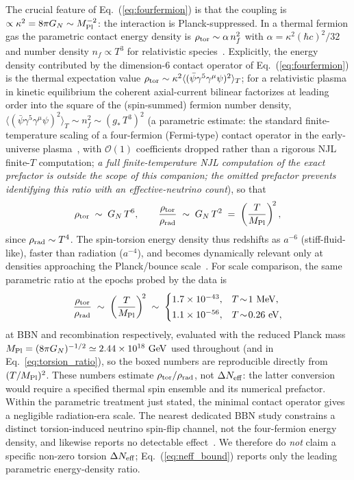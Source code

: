 \documentclass[aps,prd,twocolumn,superscriptaddress,showpacs,preprintnumbers,nofootinbib,longbibliography,floatfix]{revtex4-2}
\newcommand{\Neff}{N_{\rm eff}}
\begin{document}
The crucial feature of Eq.~(\ref{eq:fourfermion}) is that the coupling is
$\propto\kappa^2=8\pi G_N\sim M_{\rm Pl}^{-2}$: the interaction is
Planck-suppressed. In a thermal fermion gas the parametric contact energy
density is $\rho_{\rm tor}\sim\alpha\,n_f^2$ with $\alpha=\kappa^2(\hbar
c)^2/32$ and number density $n_f\propto T^3$ for relativistic
species~\cite{UngerPoplawski2019}. Explicitly, the energy density
contributed by the dimension-6 contact operator of
Eq.~(\ref{eq:fourfermion}) is the thermal expectation value
$\rho_{\rm tor}\sim\kappa^2\langle(\bar\psi\gamma^5\gamma^\mu\psi)^2\rangle_T$;
for a relativistic plasma in kinetic equilibrium the coherent axial-current
bilinear factorizes at leading order into the square of the (spin-summed)
fermion number density, $\langle(\bar\psi\gamma^5\gamma^\mu\psi)^2\rangle_T
\sim n_f^2 \sim (g_\ast\,T^3)^2$ (a parametric estimate: the standard
finite-temperature scaling of a four-fermion (Fermi-type) contact operator in
the early-universe plasma~\cite{KapustaGale2006}, with $\mathcal{O}(1)$
coefficients dropped rather than a rigorous NJL finite-$T$ computation;
\emph{a full finite-temperature NJL computation of the exact prefactor is outside the scope
of this companion; the omitted prefactor prevents identifying this ratio with
an effective-neutrino count}), so that
\begin{equation}
\rho_{\rm tor}\;\sim\;G_N\,T^6 ,\qquad
\frac{\rho_{\rm tor}}{\rho_{\rm rad}}\;\sim\;G_N\,T^2\;=\;
\left(\frac{T}{M_{\rm Pl}}\right)^{\!2} ,
\label{eq:torsion_ratio}
\end{equation}
since $\rho_{\rm rad}\sim T^4$. The spin-torsion energy density thus redshifts
as $a^{-6}$ (stiff-fluid-like), faster than radiation ($a^{-4}$), and becomes
dynamically relevant only at densities approaching the Planck/bounce
scale~\cite{UngerPoplawski2019}. For scale comparison, the same parametric
ratio at the epochs probed by the data is
\begin{equation}
\frac{\rho_{\rm tor}}{\rho_{\rm rad}}\;\sim\;\left(\frac{T}{M_{\rm Pl}}\right)^{\!2}
\;\sim\;
\begin{cases}
1.7\times 10^{-43}, & T\!\sim\!1\ \mathrm{MeV},\\[2pt]
1.1\times 10^{-56}, & T\!\sim\!0.26\ \mathrm{eV},
\end{cases}
\label{eq:neff_bound}
\end{equation}
at BBN and recombination respectively, evaluated with the reduced Planck
mass $M_{\rm Pl}=(8\pi G_N)^{-1/2}\simeq 2.44\times10^{18}\ \mathrm{GeV}$
used throughout (and in Eq.~\ref{eq:torsion_ratio}), so the boxed numbers are
reproducible directly from $(T/M_{\rm Pl})^2$.
These numbers estimate $\rho_{\rm tor}/\rho_{\rm rad}$, not $\Delta N_{\rm eff}$:
the latter conversion would require a specified thermal spin ensemble and its
numerical prefactor. Within the parametric treatment just stated, the minimal
contact operator gives a negligible radiation-era scale. The nearest dedicated BBN study
constrains a distinct torsion-induced neutrino spin-flip channel, not the
four-fermion energy density, and likewise reports no detectable
effect~\cite{Bruggen1999}. We therefore do \emph{not} claim a specific
non-zero torsion $\Delta\Neff$; Eq.~(\ref{eq:neff_bound}) reports only the
leading parametric energy-density ratio.
\end{document}
